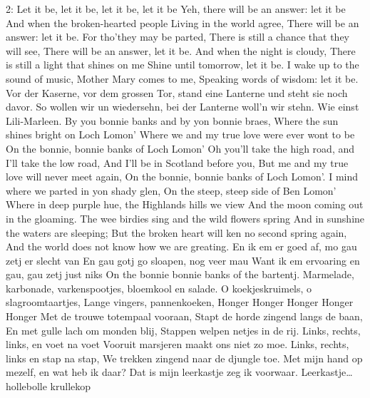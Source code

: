 \documentclass{article}
\begin{document}
\begin{songs}{}
2:
Let it be, let it be, let it be, let it be
Yeh, there will be an answer: let it be
\endchorus
\beginverse*
And when the broken-hearted people
Living in the world  agree,
There will be an answer: let it be.
For tho’they may be parted,
There is still a chance that they will see,
There will be an answer, let it be. 
\endverse
\beginverse*
And when the night is cloudy,
There is still a light that shines on me
Shine until tomorrow, let it be. 
I wake up to the sound of music, 
Mother Mary comes to me,
Speaking words of wisdom: let it be. 
\endverse
\endsong
{}
\beginverse*
Vor der Kaserne, vor dem grossen Tor,
stand eine Lanterne und steht sie noch davor.
So wollen wir un wiedersehn,
bei der Lanterne woll’n wir stehn.
Wie einst Lili-Marleen.
\endverse
\endsong
{}
\beginverse*
By you bonnie banks and by yon bonnie braes,
Where the sun shines bright on Loch Lomon’
Where we and my true love were ever wont to be
On the bonnie, bonnie banks of Loch Lomon’
\endverse
\beginchorus
Oh you’ll take the high road, and I’ll take the low road,
And I’ll be in Scotland before you,
But me and my true love will never meet again,
On the bonnie, bonnie banks of Loch Lomon’.
\endchorus
\beginverse*
I mind where we parted in yon shady glen,
On the steep, steep side of Ben Lomon’
Where in deep purple hue, the Highlands hills we view
And the moon coming out in the gloaming. 
The wee birdies sing and the wild flowers spring
And in sunshine the waters are sleeping;
But the broken heart will ken no second spring again,
And the world does not know how we are greating. 
\endverse
\beginverse*
En ik em er goed af, mo gau zetj er slecht van
En gau gotj go sloapen, nog veer mau
Want ik em ervoaring en gau, gau zetj just niks
On the bonnie bonnie banks of the bartentj.
\endverse
\endsong
{}
\beginverse*
Marmelade, karbonade, varkenspootjes, bloemkool en salade.
O koekjeskruimels, o slagroomtaartjes,
Lange vingers, pannenkoeken,
\endverse
\beginchorus
Honger
Honger
Honger
Honger
Honger
\endchorus
\endsong
{}
\beginverse*
Met de trouwe totempaal vooraan,
Stapt de horde zingend langs de baan,
En met gulle lach om monden blij,
Stappen welpen netjes in de rij. 
Links, rechts, links, en voet na voet
Vooruit marsjeren maakt ons niet zo moe.
Links, rechts, links en stap na stap,
We trekken zingend naar de djungle toe. 
\endverse
\endsong
{}
\beginverse*
Met mijn hand op mezelf, en wat heb ik daar?
Dat is mijn leerkastje zeg ik voorwaar.
Leerkastje… hollebolle krullekop

\end{songs}
\end{document}
